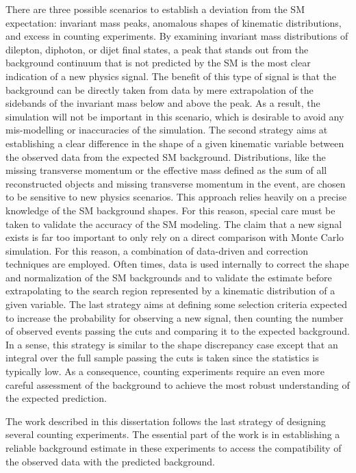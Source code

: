 There are three possible scenarios to establish a deviation from  the 
SM expectation: invariant mass peaks, 
anomalous shapes of kinematic distributions, and excess in counting 
experiments.
By examining invariant mass distributions of dilepton, diphoton, or 
dijet final states, a peak that stands out from the background 
continuum that is not predicted by the SM is the most clear indication 
of a new physics signal.
The benefit of this type of signal is that the background can be directly 
taken from data by mere extrapolation of the sidebands of the invariant 
mass below and above the peak. As a result, the simulation will not 
be important in this scenario, which is desirable to avoid any 
mis-modelling or inaccuracies of the simulation.
The second strategy aims at establishing a clear difference in the shape 
of a given kinematic variable between the 
observed data from the expected SM background. 
Distributions, like the missing transverse momentum or the effective 
mass defined as the sum of all reconstructed objects 
and missing transverse momentum in the event, 
are chosen to be sensitive to new physics scenarios.
This approach relies 
heavily on a  precise knowledge of the SM background shapes.
For this reason, special care must be taken to validate the accuracy 
of the SM modeling. 
The claim that a new signal exists is far too important to only rely 
on a direct comparison with Monte Carlo simulation. For this reason, 
a combination of data-driven and correction techniques are employed. 
Often times, data is used internally to correct 
the shape and normalization of the SM backgrounds and to validate the estimate 
before extrapolating to the search region represented by a kinematic 
distribution of a given variable.
The last strategy aims at defining some selection criteria expected to 
increase the probability for observing a new signal, then counting the 
number of observed events passing the cuts and comparing it to 
the expected background.
In a sense, this strategy is similar to the shape discrepancy case 
except that an integral over the  full sample 
passing the cuts is taken since the statistics is typically low.
As a consequence, counting experiments require an even more careful
assessment of the background to achieve the most robust 
understanding of the expected prediction.

The work described in this dissertation follows the last strategy 
of designing several counting experiments. The essential part of the 
work is in establishing a reliable background estimate in these 
experiments to access the compatibility of the observed data with the 
predicted background.

